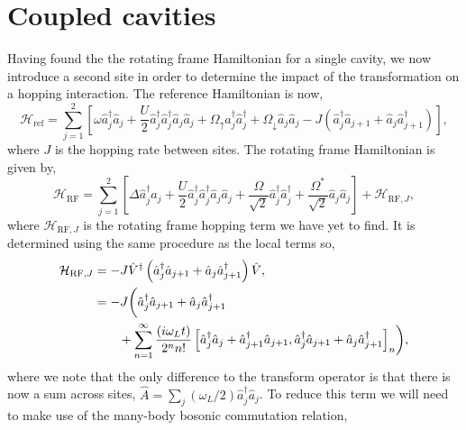 \section{Coupled cavities}

Having found the the rotating frame Hamiltonian for a single cavity, we now introduce a second site in order to determine the impact of the transformation on a hopping interaction. The reference Hamiltonian is now,
\begin{equation}
	\mathcal{H}_{\mathrm{ref}} = \sum_{j=1}^{2}\left[\omega\hat{a}_{j}^{\dagger}\hat{a}_{j} + \frac{U}{2}\hat{a}_{j}^{\dagger}\hat{a}_{j}^{\dagger}\hat{a}_{j}\hat{a}_{j} + \Omega_{\uparrow}\hat{a}_{j}^{\dagger}\hat{a}_{j}^{\dagger} + \Omega_{\downarrow}\hat{a}_{j}\hat{a}_{j} - J\left(\hat{a}_{j}^{\dagger}\hat{a}_{j+1} + \hat{a}_{j}\hat{a}_{j+1}^{\dagger} \right) \right],
	\label{eq:rot23}
\end{equation}
where \(J\) is the hopping rate between sites. The rotating frame Hamiltonian is given by,
\begin{equation}
	\mathcal{H}_{\mathrm{RF}} = \sum_{j=1}^{2} \left[ \Delta\hat{a}_{j}^{\dagger}\hat{a}_{j} + \frac{U}{2}\hat{a}_{j}^{\dagger}\hat{a}_{j}^{\dagger}\hat{a}_{j}\hat{a}_{j} + \frac{\Omega}{\sqrt{2}}\hat{a}_{j}^{\dagger}\hat{a}_{j}^{\dagger} + \frac{\Omega^{*}}{\sqrt{2}}\hat{a}_{j}\hat{a}_{j} \right] + \mathcal{H}_{\mathrm{RF},J},
	\label{eq:rot24}
\end{equation}
where \(\mathcal{H}_{\mathrm{RF},J}\) is the rotating frame hopping term we have yet to find. It is determined using the same procedure as the local terms so,
\begin{align}
	\mathcal{H}_{\mathrm{RF},J} &= -J\hat{V}^{\dagger}\left(\hat{a}_{j}^{\dagger}\hat{a}_{j+1} + \hat{a}_{j}\hat{a}_{j+1}^{\dagger}\right)\hat{V}, \notag \\
	&= -J\biggl(\hat{a}_{j}^{\dagger}\hat{a}_{j+1} + \hat{a}_{j}\hat{a}_{j+1}^{\dagger} \notag \\ 
	&\qquad + \sum_{n=1}^{\infty} \frac{(i\omega_{L}t)}{2^{n}n!} \left[\hat{a}_{j}^{\dagger}\hat{a}_{j} + \hat{a}_{j+1}^{\dagger}\hat{a}_{j+1}, \hat{a}_{j}^{\dagger}\hat{a}_{j+1} + \hat{a}_{j}\hat{a}_{j+1}^{\dagger}\right]_{n}\biggr),
	\label{eq:rot25}
\end{align}
where we note that the only difference to the transform operator is that there is now a sum across sites, \(\hat{A} = \sum_{j} (\omega_{L}/2)\hat{a}_{j}^{\dagger}\hat{a}_{j}\). To reduce this term we will need to make use of the many-body bosonic commutation relation,
